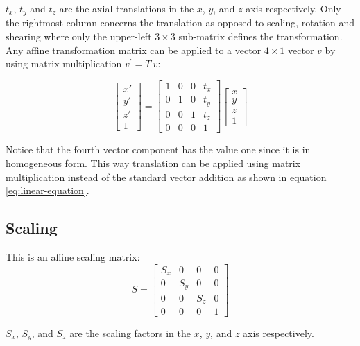 $t_x$, $t_y$ and $t_z$ are the axial translations in the $x$, $y$, and $z$
axis respectively. Only the rightmost column concerns the
translation as opposed to scaling, rotation and shearing where only
the upper-left $3\times3$ sub-matrix defines the transformation.
Any affine transformation matrix can be applied to a vector $4 \times
1$ vector $v$ by using matrix multiplication $v^\prime = T \ v$:

\begin{equation}
\begin{bmatrix} 
x' \\ y' \\ z' \\ 1 
\end{bmatrix} 
= 
\begin{bmatrix} 
1 & 0 & 0 & t_x \\ 
0 & 1 & 0 & t_y \\ 
0 & 0 & 1 & t_z \\
0 & 0 & 0 & 1 
\end{bmatrix} 
\begin{bmatrix} 
x \\ y \\ z \\ 1 
\end{bmatrix}
\end{equation} 

Notice that the fourth vector component has the value one since it is
in homogeneous form. This way translation can be applied using
matrix multiplication instead of the standard vector addition as shown
in equation \eqref{eq:linear-equation}. \\ 

\subsection*{Scaling}
\label{sec:basic_math_scaling}
This is an affine scaling matrix:
\begin{equation}
\label{eq:scaling_matrix}
S = 
\begin{bmatrix} 
S_x & 0 & 0 & 0 \\ 
0 & S_y & 0 & 0 \\ 
0 & 0 & S_z & 0 \\
0 & 0 & 0 & 1 
\end{bmatrix} 
\end{equation} 

$S_x$, $S_y$, and $S_z$ are the scaling factors in the $x$, $y$, and $z$
axis respectively. \\

